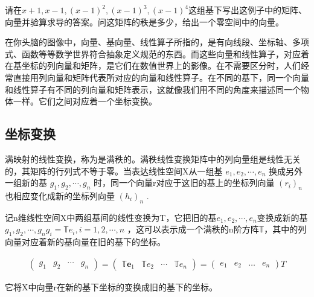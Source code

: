 请在$ x+1, x-1, (x-1)^2,(x-1)^3,(x-1)^4 $这组基下写出这例子中的矩阵、向量并验算求导的答案。问这矩阵的秩是多少，给出一个零空间中的向量。

\songti

在你头脑的图像中，向量、基向量、线性算子所指的，是有向线段、坐标轴、多项式、函数等等数学世界符合抽象定义规范的东西。而这些向量和线性算子，对应着在基坐标的列向量和矩阵，是它们在数值世界上的影像。在不需要区分时，人们经常直接用列向量和矩阵代表所对应的向量和线性算子。在不同的基下，同一个向量和线性算子有不同的列向量和矩阵表示，这就像我们用不同的角度来描述同一个物体一样。它们之间对应着一个坐标变换。

\subsection{坐标变换}

满映射的线性变换，称为是满秩的。满秩线性变换矩阵中的列向量组是线性无关的，其矩阵的行列式不等于零。当表达线性空间X从一组基 $ {e_1,e_2,\cdots,e_n} $ 换成另外一组新的基 $ {g_1,g_2,\cdots,g_n} $ 时，同一个向量r对应于这旧的基上的坐标列向量 $ (r_i)_n $ 也相应变化成新的坐标列向量 $ (h_i)_n $ . 

记n维线性空间X中两组基间的线性变换为T，它把旧的基$ {e_1,e_2,\cdots,e_n} $变换成新的基$ {g_1,g_2,\cdots,g_n} g_i = \mathbb{T}e_i, i=1,2,\cdots,n$ ，这可以表示成一个满秩的n阶方阵$ \mathbb{T} $，其中的列向量对应着新的基向量在旧的基下的坐标。

\begin{gather*}
	\begin{pmatrix}{g}_1& {g}_2& \cdots & {g}_n \end{pmatrix} = \begin{pmatrix} \mathbb{T}\textbf{e}_1& \mathbb{T}{e}_2& \cdots & \mathbb{T}{e}_n \end{pmatrix} =\begin{pmatrix} {e_1} &{e_2}  &\dots  & {e_n}\end{pmatrix}T
\end{gather*}

它将X中向量r在新的基下坐标的变换成旧的基下的坐标。


